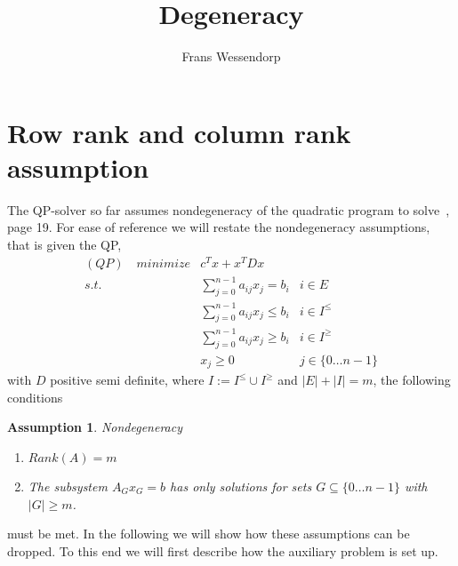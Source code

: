 \documentclass[a4paper]{article}
\title{Degeneracy}
\author{Frans Wessendorp}
\newtheorem{assumption}{Assumption}
\begin{document}
\maketitle
\section{Row rank and column rank assumption}
The QP-solver so far assumes nondegeneracy of the quadratic program to
solve~\cite{Sven}, page 19. For ease of reference we will restate the
nondegeneracy assumptions, that is given the QP,
\begin{eqnarray}
\label{def:QP}
(QP)\quad minimize&  c^{T}x + x^{T} D x      	&  \nonumber \\
s.t.	 & \sum_{j=0}^{n-1}a_{ij}x_{j} = b_{i}	& i \in E  \nonumber \\
	 & \sum_{j=0}^{n-1}a_{ij}x_{j} \leq b_{i} & i \in I^{\leq} \\
	 & \sum_{j=0}^{n-1}a_{ij}x_{j} \geq b_{i} & i \in I^{\geq}  \nonumber \\
 	 & x_{j} \geq 0				& j \in \{0 \ldots n-1 \}
	 \nonumber
\end{eqnarray}
with $D$ positive semi definite, where $I:= I^{\leq} \cup I^{\geq}$ and
$\left| E \right| + \left| I \right| = m$,
the following conditions
\begin{assumption} \label{ass:nondegeneracy}
Nondegeneracy

\begin{enumerate}
\item $Rank\left( A \right) = m$
\item The subsystem $A_{G}x_{G} = b$ has only solutions for sets $G \subseteq
\{0 \ldots n-1\}$ with $\left|G \right| \geq m$.
\end{enumerate}
\end{assumption}
must be met. In the following we will show how these
assumptions can be dropped. To this end we will first describe how the auxiliary
problem is set up. 
\end{document}
